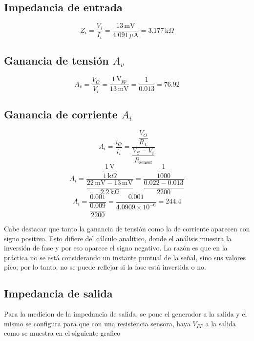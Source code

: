    
    \noindent
    \begin{minipage}[t]{0.48\linewidth}
        \subsection*{Impedancia de entrada}
        \[
        Z_i = \frac{V_i}{I_i}
             = \frac{13\,\text{mV}}{4.091\,\mu\text{A}}
             = \boxed{3.177\,\text{k}\Omega}
        \]
    
        \subsection*{Ganancia de tensión $A_v$}
        \[
        A_v=\frac{V_O}{V_i}
             =\frac{1\,\text{V}_{pp}}{13\,\text{mV}}
             =\frac{1}{0.013}
             =\boxed{76.92}
        \]
    \end{minipage}\hfill
    \begin{minipage}[t]{0.48\linewidth}
        \subsection*{Ganancia de corriente $A_i$}
        \[
        A_i=\frac{i_O}{i_i}
            =\frac{\dfrac{V_O}{R_L}}{\dfrac{V_S - V_i}{R_{\text{sensor}}}}
        \]
        \[
        A_i=\frac{\dfrac{1\,\text{V}}{1\,\text{k}\Omega}}{\dfrac{22\,\text{mV}-13\,\text{mV}}{2.2\,\text{k}\Omega}}
            =\frac{\dfrac{1}{1000}}{\dfrac{0.022-0.013}{2200}}
        \]
        \[
        A_i=\frac{0.001}{\dfrac{0.009}{2200}}
            =\frac{0.001}{4.0909\times10^{-6}}
            =\boxed{244.4}
        \]
    \end{minipage}
    \vspace{0.5cm}

      Cabe destacar que tanto la ganancia de tensión como la de corriente aparecen con signo positivo. Esto difiere del 
      cálculo analítico, donde el análisis muestra la inversión de fase y por eso aparece el signo negativo. La razón 
      es que en la práctica no se está considerando un instante puntual de la señal, sino sus valores pico; por lo 
      tanto, no se puede reflejar si la fase está invertida o no.

    \subsection{Impedancia de salida}
    Para la medicion de la impedancia de salida, se pone el generador a la salida y el mismo se configura para que con
    una resistencia sensora, haya $V_{PP}$ a la salida como se muestra en el siguiente grafico

